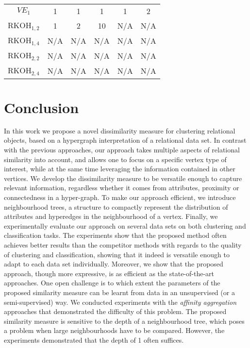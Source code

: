 \begin{table}
\begin{center}
\begin{tabular}[htb]{@{}cccccc@{}}
		$VE_1$			&	1		&	1	   &  	1	  &		1	   &   	2		\\
		
		RKOH$_{1,2}$	&	1		&	2	   &  	10	  &	N/A		   &   N/A			\\
		
		RKOH$_{1,4}$	&	N/A		&	N/A	   &  N/A 	  &  N/A	   &  N/A 		\\
		
		RKOH$_{2,2}$	&	N/A		&	N/A	   &  N/A 	  &  N/A	   &  N/A 		\\
		
		RKOH$_{2,4}$	&	N/A		&	N/A	   &  N/A 	  &  N/A	   &  N/A 		\\
		\bottomrule
		\end{tabular}				
		
	\end{center}

\end{table}



\section{Conclusion}

In this work we propose a novel dissimilarity measure for clustering relational objects, based on a hypergraph interpretation of a relational data set.
In contrast with the previous approaches, our approach takes multiple aspects of relational similarity into account, and  allows one to focus on a specific vertex type of interest, while at the same time leveraging the information contained in other vertices.
We develop the dissimilarity measure to be versatile enough to capture relevant information, regardless whether it comes from attributes, proximity or connectedness in a hyper-graph.
To make our approach efficient, we introduce neighbourhood trees, a structure to compactly represent the distribution of attributes and hyperedges in the neighbourhood of a vertex.
Finally, we experimentally evaluate our approach on several data sets on both clustering and classification tasks. 
The experiments show that the proposed method often achieves better results than the competitor methods with regards to the quality of clustering and classification, showing that it indeed is versatile enough to adapt to each data set individually.
Moreover, we show that the proposed approach, though more expressive, is as efficient as the state-of-the-art approaches.
One open challenge is to which extent the parameters of the proposed similarity measure can be learnt from data in an unsupervised (or a semi-supervised) way.
We conducted experiments with the \textit{affinity aggregation} approaches that demonstrated the difficulty of this problem.
The proposed similarity measure is  sensitive to the depth of a neighbourhood tree, which poses a problem when large neighbourhoods have to be compared.
However, the experiments demonstrated that the depth of 1 often suffices.
\vspace{2pt}



